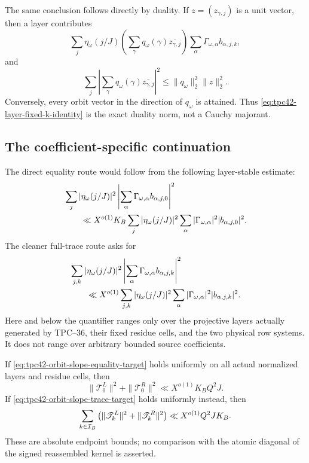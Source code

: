The same conclusion follows directly by duality.  If
\(z=(z_{\gamma,j})\) is a unit vector, then a layer contributes
\begin{equation}
 \sum_j\eta_\omega(j/J)
 \left(\sum_\gamma q_\omega(\gamma)
       \overline{z_{\gamma,j}}\right)
 \sum_\alpha\Gamma_{\omega,\alpha}b_{\alpha,j,k},
 \label{eq:tpc42-layer-duality}
\end{equation}
and
\begin{equation}
 \sum_j\left|
  \sum_\gamma q_\omega(\gamma)
  \overline{z_{\gamma,j}}
 \right|^2
 \le\|q_\omega\|_2^2\|z\|_2^2.
 \label{eq:tpc42-dual-orbit-bound}
\end{equation}
Conversely, every orbit vector in the direction of \(q_\omega\) is
attained.  Thus \eqref{eq:tpc42-layer-fixed-k-identity} is the exact
duality norm, not a Cauchy majorant.

\subsection{The coefficient-specific continuation}

The direct equality route would follow from the following layer-stable
estimate:
\begin{align}
 &\sum_j|\eta_\omega(j/J)|^2
 \left|
  \sum_\alpha\Gamma_{\omega,\alpha}b_{\alpha,j,0}
 \right|^2
 \notag\\
 &\qquad\ll X^{o(1)}K_B
 \sum_j|\eta_\omega(j/J)|^2
 \sum_\alpha
 |\Gamma_{\omega,\alpha}|^2|b_{\alpha,j,0}|^2.
 \label{eq:tpc42-orbit-slope-equality-target}
\end{align}
The cleaner full-trace route asks for
\begin{align}
 &\sum_{j,k}|\eta_\omega(j/J)|^2
 \left|
  \sum_\alpha\Gamma_{\omega,\alpha}b_{\alpha,j,k}
 \right|^2
 \notag\\
 &\qquad\ll X^{o(1)}
 \sum_{j,k}|\eta_\omega(j/J)|^2
 \sum_\alpha
 |\Gamma_{\omega,\alpha}|^2|b_{\alpha,j,k}|^2.
 \label{eq:tpc42-orbit-slope-trace-target}
\end{align}
Here and below the quantifier ranges only over the projective layers
actually generated by TPC--36, their fixed residue cells, and the two
physical row systems.  It does not range over arbitrary bounded source
coefficients.

\begin{proposition}
\label{prop:tpc42-layer-to-physical}
If \eqref{eq:tpc42-orbit-slope-equality-target} holds uniformly on all
actual normalized layers and residue cells, then
\begin{equation}
 \|\mathscr T_0^L\|^2+\|\mathscr T_0^R\|^2
 \ll X^{o(1)}K_BQ^2J.
 \label{eq:tpc42-layer-to-equality-endpoint}
\end{equation}
If \eqref{eq:tpc42-orbit-slope-trace-target} holds uniformly instead,
then
\begin{equation}
 \sum_{k\in\mathcal I_B}
 \left(\|\mathscr T_k^L\|^2+\|\mathscr T_k^R\|^2\right)
 \ll X^{o(1)}Q^2JK_B.
 \label{eq:tpc42-layer-to-trace-endpoint}
\end{equation}
These are absolute endpoint bounds; no comparison with the atomic
diagonal of the signed reassembled kernel is asserted.
\end{proposition}

